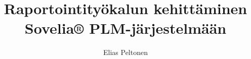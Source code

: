 \documentclass[language=finnish,version=final,mainfont=none,sharelatex=false]{utuftthesis}
\providecommand{\algorithmname}{Algoritmi}
\begin{document}
\title{Raportointityökalun kehittäminen Sovelia® PLM-järjestelmään}
\author{Elias Peltonen}

\maketitle


\tableofcontents

\listoffigures

\listoftables

\listofacronyms

\renewcommand{\algorithmname}{\listingscaption}


\begin{comment}
To better organize things, create a new tex file for each chapter
and input it below.

Avoid using the å, ä, ö or <space> characters in referred names and
underscores \_ in file names (may break hyperref).

Good luck! Thanks.
\end{comment}






%
%


\printbibliography

\begin{comment}
Important! Create the appendix chapters with command \textbackslash appchapter\{some
name\} instead of \textbackslash chapter\{some name\} for the automagic
page counting to work!
\end{comment}


\end{document}
